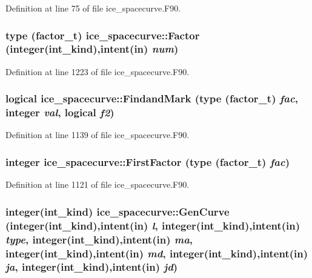 Definition at line 75 of file ice\_\-spacecurve.F90.\hypertarget{namespaceice__spacecurve_a0e21c6fb09762431569057a3a6a1ceac}{
\subsubsection[{Factor}]{\setlength{\rightskip}{0pt plus 5cm}type ({\bf factor\_\-t}) ice\_\-spacecurve::Factor (integer(int\_\-kind),intent(in) {\em num})}}
\label{namespaceice__spacecurve_a0e21c6fb09762431569057a3a6a1ceac}


Definition at line 1223 of file ice\_\-spacecurve.F90.\hypertarget{namespaceice__spacecurve_a269b5f206b1895faa78dfb38c8a5cc4e}{
\subsubsection[{FindandMark}]{\setlength{\rightskip}{0pt plus 5cm}logical ice\_\-spacecurve::FindandMark (type (factor\_\-t) {\em fac}, \/  integer {\em val}, \/  logical {\em f2})}}
\label{namespaceice__spacecurve_a269b5f206b1895faa78dfb38c8a5cc4e}


Definition at line 1139 of file ice\_\-spacecurve.F90.\hypertarget{namespaceice__spacecurve_a6c86eb0e04276a6417a2010753af3895}{
\subsubsection[{FirstFactor}]{\setlength{\rightskip}{0pt plus 5cm}integer ice\_\-spacecurve::FirstFactor (type (factor\_\-t) {\em fac})}}
\label{namespaceice__spacecurve_a6c86eb0e04276a6417a2010753af3895}


Definition at line 1121 of file ice\_\-spacecurve.F90.\hypertarget{namespaceice__spacecurve_ae30af6486456c0f4098a6c03aea8ec6d}{
\subsubsection[{GenCurve}]{\setlength{\rightskip}{0pt plus 5cm}integer(int\_\-kind) ice\_\-spacecurve::GenCurve (integer(int\_\-kind),intent(in) {\em l}, \/  integer(int\_\-kind),intent(in) {\em type}, \/  integer(int\_\-kind),intent(in) {\em ma}, \/  integer(int\_\-kind),intent(in) {\em md}, \/  integer(int\_\-kind),intent(in) {\em ja}, \/  integer(int\_\-kind),intent(in) {\em jd})}}
\label{namespaceice__spacecurve_ae30af6486456c0f4098a6c03aea8ec6d}


